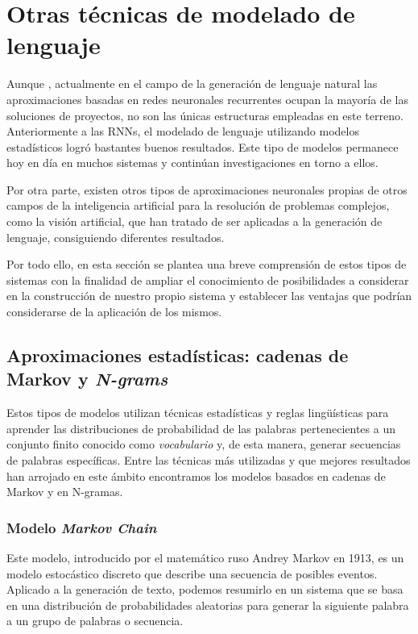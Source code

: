 \section{Otras técnicas de modelado de lenguaje}
Aunque , actualmente en el campo de la generación de lenguaje natural las aproximaciones basadas en redes neuronales recurrentes ocupan la mayoría de las soluciones de proyectos, no son las únicas estructuras empleadas en este terreno. Anteriormente a las RNNs, el modelado de lenguaje utilizando modelos estadísticos logró bastantes buenos resultados. Este tipo de modelos permanece hoy en día en muchos sistemas y continúan investigaciones en torno a ellos.

Por otra parte, existen otros tipos de aproximaciones neuronales propias de otros campos de la inteligencia artificial para la resolución de problemas complejos, como la visión artificial, que han tratado de ser aplicadas a la generación de lenguaje, consiguiendo diferentes resultados. 

Por todo ello, en esta sección se plantea una breve comprensión de estos tipos de sistemas con la finalidad de ampliar el conocimiento de posibilidades a considerar en la construcción de nuestro propio sistema y establecer las ventajas que podrían considerarse de la aplicación de los mismos.


\subsection{Aproximaciones estadísticas: cadenas de Markov y \textit{N-grams}}
\label{sec:modelos_estadisticos}
Estos tipos de modelos utilizan técnicas estadísticas y reglas lingüísticas para aprender las distribuciones de probabilidad de las palabras pertenecientes a un conjunto finito conocido como \textit{vocabulario} y, de esta manera, generar secuencias de palabras específicas. Entre las técnicas más utilizadas y que mejores resultados han arrojado en este ámbito encontramos los modelos basados en cadenas de Markov y en N-gramas.

\subsubsection{Modelo \textit{Markov Chain}}

Este modelo, introducido por el matemático ruso Andrey Markov en 1913, es un modelo estocástico discreto que describe una secuencia de posibles eventos. Aplicado a la generación de texto, podemos resumirlo en un sistema que se basa en una distribución de probabilidades aleatorias para generar la siguiente palabra a un grupo de palabras o secuencia. 

